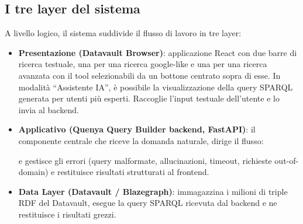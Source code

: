   \subsection{I tre layer del sistema}\label{subsec:tre_layer}
    A livello logico, il sistema suddivide il flusso di lavoro in tre layer:
    \begin{itemize}
      \item \textbf{Presentazione (Datavault Browser)}: applicazione React con due barre di ricerca testuale, una per una ricerca google-like  e una per una ricerca avanzata con il tool  selezionabili da un bottone centrato sopra di esse.
      In modalità ``Assistente IA'', è possibile la visualizzazione della query SPARQL generata per utenti più esperti. Raccoglie l'input testuale dell'utente e lo invia al backend.
      \item \textbf{Applicativo (Quenya Query Builder backend, FastAPI)}: il componente centrale che riceve la domanda naturale, dirige il flusso:
      
      \begin{center}
      \end{center}

      e gestisce gli errori (query malformate, allucinazioni, timeout, richieste out-of-domain) e restituisce risultati strutturati al frontend.
      \item \textbf{Data Layer (Datavault / Blazegraph)}: immagazzina i milioni di triple RDF del Datavault, esegue la query SPARQL ricevuta dal backend e ne restituisce i risultati grezzi.
    \end{itemize}

